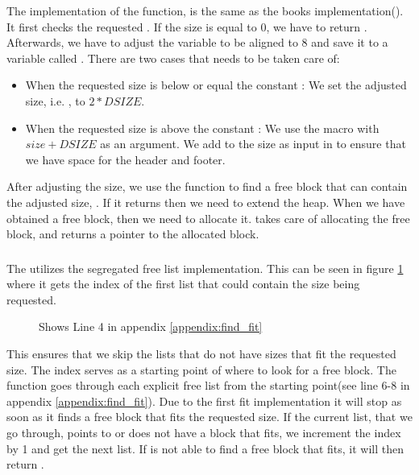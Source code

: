 The implementation of the  function, is the same as the books implementation(\cite[ch. 9.9.12]{csapp-mem}).
It first checks the requested . If the size is equal to 0, we have to return .
Afterwards, we have to adjust the variable  to be aligned to 8 and save it to a variable called . There are two cases that needs to be taken care of:
\begin{itemize}
    \item When the requested size is below or equal the constant : We set the adjusted size, i.e. , to $2 * DSIZE$.
    \item When the requested size is above the constant : We use the  macro with $size + DSIZE$ as an argument. We add  to the size as input
    in  to ensure that we have space for the header and footer.
\end{itemize}

After adjusting the size, we use the  function to find a free block that can contain the adjusted size, . If it returns  then we need to extend the heap.  When we have obtained a free block, then we need to allocate it. 
 takes care of allocating the free block, and returns a pointer to the allocated block.

\subsubsection{}

The  utilizes the segregated free list implementation. This can be seen in figure \ref{fig:get-list-index} where it gets the index of the first list that could contain the size being requested.
\begin{figure}[h]
    \centering
    \caption{Shows Line 4 in appendix \ref{appendix:find_fit}}
    \label{fig:get-list-index}
\end{figure}
This ensures that we skip the lists that do not have sizes that fit the requested size. The index serves as a starting point of where to look for a free block. The function goes through each explicit free list from the starting point(see line 6-8 in appendix \ref{appendix:find_fit}).
Due to the first fit implementation it will stop as soon as it finds a free block that fits the requested size. 
If the current list, that we go through, points to  or does not have a block that fits, we increment the index by 1 and get the next list.
If  is not able to find a free block that fits, it will then return .

